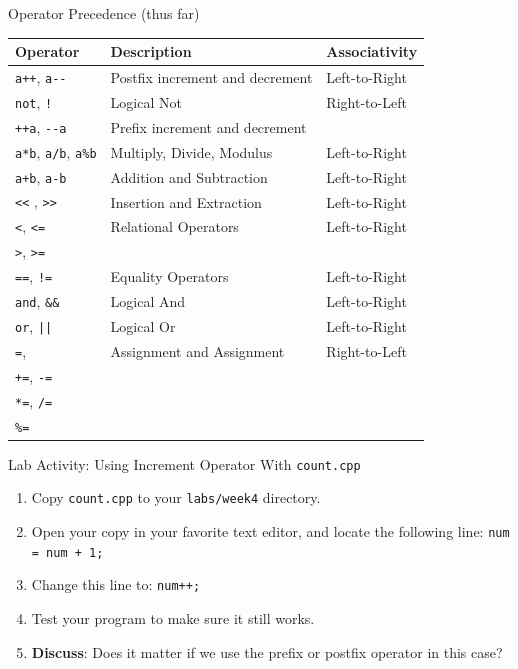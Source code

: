 \documentclass[xcolor=table]{beamer}
\begin{document}
\begin{frame}[fragile]{Operator Precedence (thus far)}
  \begin{adjustbox}{max totalheight=0.8\textheight}
    \begin{tabular}{|l|l|l|}
        \hline
        \textbf{Operator} & \textbf{Description} & \textbf{Associativity} \\
        \hline
        \texttt{a++}, \verb#a--# & Postfix increment and decrement & Left-to-Right\\
        \hline
        \texttt{not}, \texttt{!} & Logical Not & Right-to-Left\\
        \texttt{++a}, \verb#--a# & Prefix increment and decrement &  \\
        \hline
        \texttt{a*b}, \texttt{a/b}, \texttt{a\%b} & Multiply, Divide, Modulus & Left-to-Right\\
        \hline
        \texttt{a+b}, \texttt{a-b} & Addition and Subtraction & Left-to-Right\\
        \hline
        \texttt{<<} , \texttt{>>} & Insertion and Extraction & Left-to-Right \\
        \hline
        \texttt{<}, \texttt{<=} & Relational Operators & Left-to-Right\\
        \texttt{>}, \texttt{>=} & & \\
        \hline
        \texttt{==}, \texttt{!=} & Equality Operators & Left-to-Right\\
        \hline
        \texttt{and}, \texttt{\&\&} & Logical And & Left-to-Right\\
        \hline
        \texttt{or}, \texttt{||} & Logical Or & Left-to-Right\\
        \hline
        \texttt{=},  & Assignment and Assignment & Right-to-Left \\
        \texttt{+=}, \texttt{-=} & & \\
        \texttt{*=}, \texttt{/=} & & \\
        \texttt{\%=} & & \\
        \hline
    \end{tabular}
  \end{adjustbox}
\end{frame}

\begin{frame}{Lab Activity: Using Increment Operator With \texttt{count.cpp}}
  \begin{enumerate}[<+->]
    \item Copy \texttt{count.cpp} to your \texttt{labs/week4} directory.
    \item Open your copy in your favorite text editor, and locate the following line:
      \newline\texttt{num = num + 1;}
    \item Change this line to:
      \newline\texttt{num++;}
    \item Test your program to make sure it still works.
    \item \textbf{Discuss}: Does it matter if we use the prefix or postfix operator in this case?
  \end{enumerate}
\end{frame}
\end{document}

